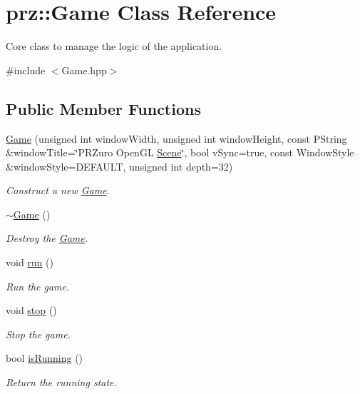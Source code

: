 \hypertarget{classprz_1_1_game}{}\section{prz\+::Game Class Reference}
\label{classprz_1_1_game}


Core class to manage the logic of the application.  




{\ttfamily \#include $<$Game.\+hpp$>$}

\subsection*{Public Member Functions}
\begin{DoxyCompactItemize}
\item 
\mbox{\hyperlink{classprz_1_1_game_a7d4e2a604dc46ca59fe9ab1911148a08}{Game}} (unsigned int window\+Width, unsigned int window\+Height, const P\+String \&window\+Title=\char`\"{}P\+R\+Zuro Open\+GL \mbox{\hyperlink{classprz_1_1_scene}{Scene}}\char`\"{}, bool v\+Sync=true, const Window\+Style \&window\+Style=D\+E\+F\+A\+U\+LT, unsigned int depth=32)
\begin{DoxyCompactList}\small\item\em Construct a new \mbox{\hyperlink{classprz_1_1_game}{Game}}. \end{DoxyCompactList}\item 
\mbox{\hyperlink{classprz_1_1_game_aa5c08c7c2f79d5b302b73ca9c32a66f3}{$\sim$\+Game}} ()
\begin{DoxyCompactList}\small\item\em Destroy the \mbox{\hyperlink{classprz_1_1_game}{Game}}. \end{DoxyCompactList}\item 
void \mbox{\hyperlink{classprz_1_1_game_a8456ab37b4e2b8579e9d92e682e146f1}{run}} ()
\begin{DoxyCompactList}\small\item\em Run the game. \end{DoxyCompactList}\item 
void \mbox{\hyperlink{classprz_1_1_game_a997a0bc714bb3062999bf8aceaf1952c}{stop}} ()
\begin{DoxyCompactList}\small\item\em Stop the game. \end{DoxyCompactList}\item 
bool \mbox{\hyperlink{classprz_1_1_game_a8e3f861f4ff74b0959a922b1f5911678}{is\+Running}} ()
\begin{DoxyCompactList}\small\item\em Return the running state. \end{DoxyCompactList}\end{DoxyCompactItemize}
